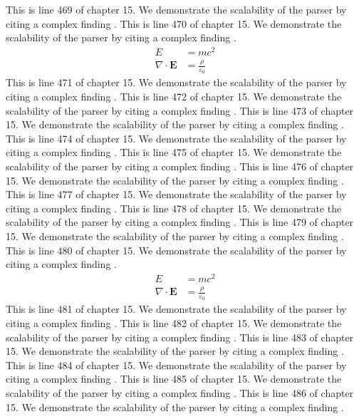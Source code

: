 This is line 469 of chapter 15. We demonstrate the scalability of the parser by citing a complex finding \cite{ref15_469}.
This is line 470 of chapter 15. We demonstrate the scalability of the parser by citing a complex finding \cite{ref15_470}.
\begin{align*}
  E &= mc^2 \\
  \nabla \cdot \mathbf{E} &= \frac{\rho}{\varepsilon_0}
\end{align*}
This is line 471 of chapter 15. We demonstrate the scalability of the parser by citing a complex finding \cite{ref15_471}.
This is line 472 of chapter 15. We demonstrate the scalability of the parser by citing a complex finding \cite{ref15_472}.
This is line 473 of chapter 15. We demonstrate the scalability of the parser by citing a complex finding \cite{ref15_473}.
This is line 474 of chapter 15. We demonstrate the scalability of the parser by citing a complex finding \cite{ref15_474}.
This is line 475 of chapter 15. We demonstrate the scalability of the parser by citing a complex finding \cite{ref15_475}.
This is line 476 of chapter 15. We demonstrate the scalability of the parser by citing a complex finding \cite{ref15_476}.
This is line 477 of chapter 15. We demonstrate the scalability of the parser by citing a complex finding \cite{ref15_477}.
This is line 478 of chapter 15. We demonstrate the scalability of the parser by citing a complex finding \cite{ref15_478}.
This is line 479 of chapter 15. We demonstrate the scalability of the parser by citing a complex finding \cite{ref15_479}.
This is line 480 of chapter 15. We demonstrate the scalability of the parser by citing a complex finding \cite{ref15_480}.
\begin{align*}
  E &= mc^2 \\
  \nabla \cdot \mathbf{E} &= \frac{\rho}{\varepsilon_0}
\end{align*}
This is line 481 of chapter 15. We demonstrate the scalability of the parser by citing a complex finding \cite{ref15_481}.
This is line 482 of chapter 15. We demonstrate the scalability of the parser by citing a complex finding \cite{ref15_482}.
This is line 483 of chapter 15. We demonstrate the scalability of the parser by citing a complex finding \cite{ref15_483}.
This is line 484 of chapter 15. We demonstrate the scalability of the parser by citing a complex finding \cite{ref15_484}.
This is line 485 of chapter 15. We demonstrate the scalability of the parser by citing a complex finding \cite{ref15_485}.
This is line 486 of chapter 15. We demonstrate the scalability of the parser by citing a complex finding \cite{ref15_486}.
